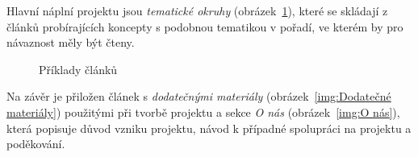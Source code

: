 \documentclass[a4paper, 12pt, twoside]{article}
\begin{document}
  Hlavní náplní projektu jsou \emph{tematické okruhy} (obrázek~\ref{img:Příklady článků}), které se skládají z článků probírajících koncepty s podobnou tematikou v pořadí, ve kterém by pro návaznost měly být čteny.

  \begin{figure}[H]
    \centering

    \hfill
    \hfill

    \caption{Příklady článků}%
    \label{img:Příklady článků}%
  \end{figure}

  Na závěr je přiložen článek s \emph{dodatečnými materiály} (obrázek~\ref{img:Dodatečné materiály}) použitými při tvorbě projektu a sekce \emph{O nás} (obrázek~\ref{img:O nás}), která popisuje důvod vzniku projektu, návod k případné spolupráci na projektu a poděkování.
\end{document}
